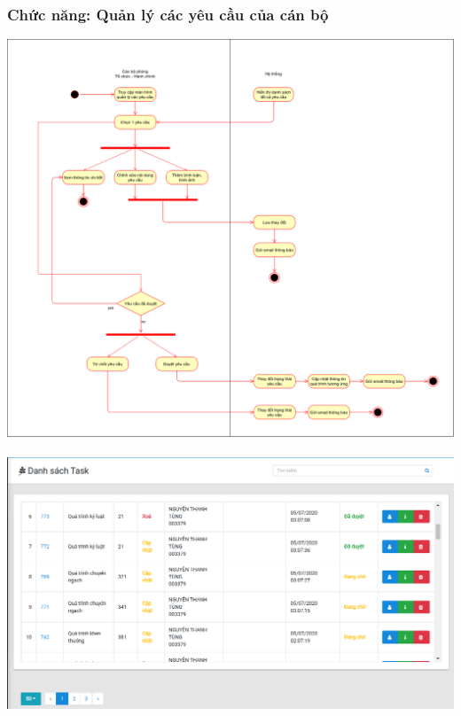 \subsubsection{Chức năng: Quản lý các yêu cầu của cán bộ}
\begin{center}
  \captionsetup{type=figure}
  \includegraphics[width=15cm]{img/UML/TchcStaff/activityQLTask.png}
\end{center}
\begin{center}
  \captionsetup{type=figure}
  \includegraphics[width=15cm]{img/Screen/qltask.png}
\end{center}

